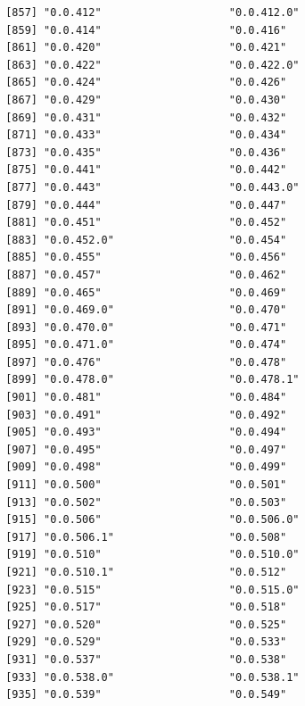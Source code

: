 \documentclass[
  letterpaper,
  DIV=11,
  numbers=noendperiod]{scrreprt}
\begin{document}
\begin{verbatim}
 [857] "0.0.412"                    "0.0.412.0"                 
 [859] "0.0.414"                    "0.0.416"                   
 [861] "0.0.420"                    "0.0.421"                   
 [863] "0.0.422"                    "0.0.422.0"                 
 [865] "0.0.424"                    "0.0.426"                   
 [867] "0.0.429"                    "0.0.430"                   
 [869] "0.0.431"                    "0.0.432"                   
 [871] "0.0.433"                    "0.0.434"                   
 [873] "0.0.435"                    "0.0.436"                   
 [875] "0.0.441"                    "0.0.442"                   
 [877] "0.0.443"                    "0.0.443.0"                 
 [879] "0.0.444"                    "0.0.447"                   
 [881] "0.0.451"                    "0.0.452"                   
 [883] "0.0.452.0"                  "0.0.454"                   
 [885] "0.0.455"                    "0.0.456"                   
 [887] "0.0.457"                    "0.0.462"                   
 [889] "0.0.465"                    "0.0.469"                   
 [891] "0.0.469.0"                  "0.0.470"                   
 [893] "0.0.470.0"                  "0.0.471"                   
 [895] "0.0.471.0"                  "0.0.474"                   
 [897] "0.0.476"                    "0.0.478"                   
 [899] "0.0.478.0"                  "0.0.478.1"                 
 [901] "0.0.481"                    "0.0.484"                   
 [903] "0.0.491"                    "0.0.492"                   
 [905] "0.0.493"                    "0.0.494"                   
 [907] "0.0.495"                    "0.0.497"                   
 [909] "0.0.498"                    "0.0.499"                   
 [911] "0.0.500"                    "0.0.501"                   
 [913] "0.0.502"                    "0.0.503"                   
 [915] "0.0.506"                    "0.0.506.0"                 
 [917] "0.0.506.1"                  "0.0.508"                   
 [919] "0.0.510"                    "0.0.510.0"                 
 [921] "0.0.510.1"                  "0.0.512"                   
 [923] "0.0.515"                    "0.0.515.0"                 
 [925] "0.0.517"                    "0.0.518"                   
 [927] "0.0.520"                    "0.0.525"                   
 [929] "0.0.529"                    "0.0.533"                   
 [931] "0.0.537"                    "0.0.538"                   
 [933] "0.0.538.0"                  "0.0.538.1"                 
 [935] "0.0.539"                    "0.0.549"                   

\end{verbatim}
\end{document}
